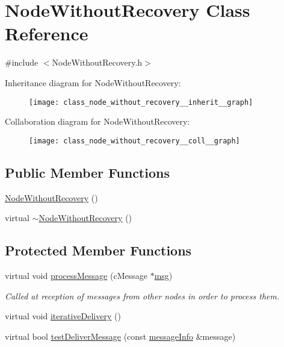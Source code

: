 \hypertarget{class_node_without_recovery}{}\section{Node\+Without\+Recovery Class Reference}
\label{class_node_without_recovery}


{\ttfamily \#include $<$Node\+Without\+Recovery.\+h$>$}



Inheritance diagram for Node\+Without\+Recovery\+:
\nopagebreak
\begin{figure}[H]
\begin{center}
\leavevmode
\texttt{[image: class\_node\_without\_recovery\_\_inherit\_\_graph]}
\end{center}
\end{figure}


Collaboration diagram for Node\+Without\+Recovery\+:
\nopagebreak
\begin{figure}[H]
\begin{center}
\leavevmode
\texttt{[image: class\_node\_without\_recovery\_\_coll\_\_graph]}
\end{center}
\end{figure}
\subsection*{Public Member Functions}
\begin{DoxyCompactItemize}
\item 
\hyperlink{class_node_without_recovery_a81c3fab3d91ae3bd6496b876d16694d8}{Node\+Without\+Recovery} ()
\item 
virtual \hyperlink{class_node_without_recovery_a2690cfda5b6d9998ee873babb3418870}{$\sim$\+Node\+Without\+Recovery} ()
\end{DoxyCompactItemize}
\subsection*{Protected Member Functions}
\begin{DoxyCompactItemize}
\item 
virtual void \hyperlink{class_node_without_recovery_a0b44132b4ebc650399711766cb050399}{process\+Message} (c\+Message $\ast$\hyperlink{_controller_8h_afa0f3b802fbc219228f7bb97996fa558}{msg})
\begin{DoxyCompactList}\small\item\em Called at reception of messages from other nodes in order to process them. \end{DoxyCompactList}\item 
virtual void \hyperlink{class_node_without_recovery_a65e21db6d6b4e72b898fd567f8b4aee2}{iterative\+Delivery} ()
\item 
virtual bool \hyperlink{class_node_without_recovery_a8cf83ec6d0af26e385dcde0bc03f5b6d}{test\+Deliver\+Message} (const \hyperlink{structures_8h_a7e7bdc1d2fff8a9436f2f352b2711ed6}{message\+Info} \&message)
\end{DoxyCompactItemize}
